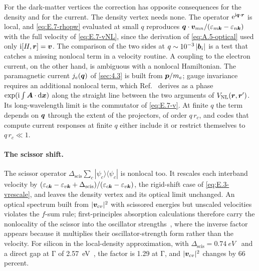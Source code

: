 For the dark-matter vertices the correction has opposite consequences for the density and for the current. The density vertex needs none. The operator $\mathrm{e}^{\mathrm{i}\bm{q}\cdot\bm{r}}$ is local, and \cref{eq:E.7-rhopw} evaluated at small $q$ reproduces $\bm{q}\cdot\bm{v}_{mn}/(\varepsilon_{m\bm{k}} - \varepsilon_{n\bm{k}})$ with the full velocity of \cref{eq:E.7-vNL}, since the derivation of \cref{eq:A.5-optical} used only $\mathrm{i}[H,\bm{r}] = \bm{v}$. The comparison of the two sides at $q \sim 10^{-3}\,|\bm{b}_i|$ is a test that catches a missing nonlocal term in a velocity routine. A coupling to the electron current, on the other hand, is ambiguous with a nonlocal Hamiltonian. The paramagnetic current $j_e(\bm{q})$ of \cref{sec:4.3} is built from $\bm{p}/m_e$; gauge invariance requires an additional nonlocal term, which Ref.~\cite[Eqs.~(18) and~(19)]{ismailbeigi2001coupling} derives as a phase $\exp(\mathrm{i}\int\bm{A}\cdot\mathrm{d}\bm{x})$ along the straight line between the two arguments of $V_{\mathrm{NL}}(\bm{r},\bm{r}')$. Its long-wavelength limit is the commutator of \cref{eq:E.7-v}. At finite $q$ the term depends on $\bm{q}$ through the extent of the projectors, of order $q\,r_c$, and codes that compute current responses at finite $q$ either include it or restrict themselves to $q\,r_c \ll 1$.

\paragraph{The scissor shift.} The scissor operator $\Delta_{\mathrm{scis}}\sum_c|\psi_c\rangle\langle\psi_c|$ is nonlocal too. It rescales each interband velocity by $(\varepsilon_{c\bm{k}} - \varepsilon_{v\bm{k}} + \Delta_{\mathrm{scis}})/(\varepsilon_{c\bm{k}} - \varepsilon_{v\bm{k}})$, the rigid-shift case of \cref{eq:E.3-vrescale}, and leaves the density vertex and its optical limit unchanged. An optical spectrum built from $|\bm{v}_{cv}|^2$ with scissored energies but unscaled velocities violates the $f$-sum rule; first-principles absorption calculations therefore carry the nonlocality of the scissor into the oscillator strengths~\cite[Sect.~VII]{zacharias2016one}, where the inverse factor appears because it multiplies their oscillator-strength form rather than the velocity. For silicon in the local-density approximation, with $\Delta_{\mathrm{scis}} = \SI{0.74}{eV}$~\cite[Sect.~VII]{zacharias2016one} and a direct gap at $\mathrm{\Gamma}$ of \SI{2.57}{eV}~\cite[Table~V]{ponce2015temperature}, the factor is 1.29 at $\mathrm{\Gamma}$, and $|\bm{v}_{cv}|^2$ changes by 66 percent.

